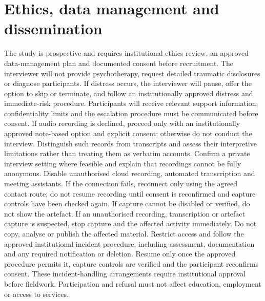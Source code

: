 \section{Ethics, data management and dissemination}
The study is prospective and requires institutional ethics review, an approved data-management plan and documented consent before recruitment. The interviewer will not provide psychotherapy, request detailed traumatic disclosures or diagnose participants. If distress occurs, the interviewer will pause, offer the option to skip or terminate, and follow an institutionally approved distress and immediate-risk procedure. Participants will receive relevant support information; confidentiality limits and the escalation procedure must be communicated before consent. If audio recording is declined, proceed only with an institutionally approved note-based option and explicit consent; otherwise do not conduct the interview. Distinguish such records from transcripts and assess their interpretive limitations rather than treating them as verbatim accounts. Confirm a private interview setting where feasible and explain that recordings cannot be fully anonymous. Disable unauthorised cloud recording, automated transcription and meeting assistants. If the connection fails, reconnect only using the agreed contact route; do not resume recording until consent is reconfirmed and capture controls have been checked again. If capture cannot be disabled or verified, do not show the artefact. If an unauthorised recording, transcription or artefact capture is suspected, stop capture and the affected activity immediately. Do not copy, analyse or publish the affected material. Restrict access and follow the approved institutional incident procedure, including assessment, documentation and any required notification or deletion. Resume only once the approved procedure permits it, capture controls are verified and the participant reconfirms consent. These incident-handling arrangements require institutional approval before fieldwork. Participation and refusal must not affect education, employment or access to services.

